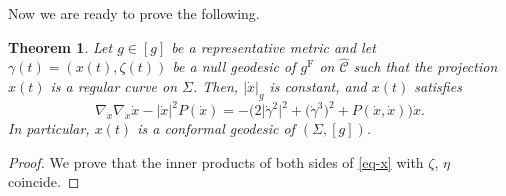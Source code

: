 \documentclass[11pt]{article}
\numberwithin{equation}{section}
\newcommand{\wh}{\widehat}
\numberwithin{equation}{section}
\newtheorem{Theorem}{Theorem}[section]
\begin{document}
Now we are ready to prove the following.

\begin{Theorem}\label{null-geod-proj}
Let $g\in[g]$ be a representative metric and let $\gamma(t)=(x(t), \zeta(t))$ be a null geodesic of $g^{\mathrm{F}}$ on $\wh{\mathcal{C}}$ such that the projection $x(t)$ is a regular curve on $\Sigma$. Then, $|\dot x|_g$ is constant, and $x(t)$ satisfies
\begin{equation}\label{eq-x}
\nabla_{\dot x}\nabla_{\dot x}\dot x-|\dot x|^2P(\dot x)=
-\bigl(2\bigl|\dot\gamma^2\bigr|^2+\bigl(\dot\gamma^3\bigr)^2+P(\dot x, \dot x)\bigr)\dot x.
\end{equation}
In particular, $x(t)$ is a conformal geodesic of $(\Sigma, [g])$.
\end{Theorem}
\begin{proof}
We prove that the inner products of both sides of \eqref{eq-x} with $\zeta$, $\eta$ coincide.


\end{proof}
\end{document}
